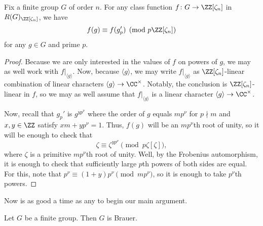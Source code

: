 \documentclass[../thesis.tex]{subfiles}
\begin{document}
\begin{lemma} \label{lem:mod-p-char-uses-primary-part}
	Fix a finite group $G$ of order $n$. For any class function $f\colon G\to\ZZ[\zeta_n]$ in $R(G)_{\ZZ[\zeta_n]}$, we have
	\[f(g)\equiv f(g_p')\pmod {p\ZZ[\zeta_n]}\]
	for any $g\in G$ and prime $p$.
\end{lemma}
\begin{proof}
	Because we are only interested in the values of $f$ on powers of $g$, we may as well work with $f|_{\langle g\rangle}$. Now, because $\langle g\rangle$, we may write $f|_{\langle g\rangle}$ as $\ZZ[\zeta_n]$-linear combination of linear characters $\langle g\rangle\to\CC^\times$. Notably, the conclusion is $\ZZ[\zeta_n]$-linear in $f$, so we may as well assume that $f|_{\langle g\rangle}$ is a linear character $\langle g\rangle\to\CC^\times$.

	Now, recall that $g_p'$ is $g^{yp^\nu}$ where the order of $g$ equals $mp^\nu$ for $p\nmid m$ and $x,y\in\ZZ$ satisfy $xm+yp^\nu=1$. Thus, $f(g)$ will be an $mp^\nu$th root of unity, so it will be enough to check that
	\[\zeta\equiv\zeta^{yp^\nu}\pmod{p\zeta[\zeta]},\]
	where $\zeta$ is a primitive $mp^\nu$th root of unity. Well, by the Frobenius automorphism, it is enough to check that sufficiently large $p$th powers of both sides are equal. For this, note that $p^\nu\equiv(1+y)p^\nu\pmod{mp^\nu}$, so it is enough to take $p^\nu$th powers.
\end{proof}
Now is as good a time as any to begin our main argument.
\begin{theorem}[Brauer] \label{thm:brauer}
	Let $G$ be a finite group. Then $G$ is Brauer.
\end{theorem}
\end{document}
